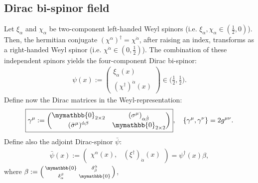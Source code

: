 \subsection{Dirac bi-spinor field} \label{sec:DiracbiSpinor}
Let $ \xi_{\alpha} $ and $ \chi_{\alpha} $ be two-component left-handed Weyl spinors (i.e. $ \xi_{\alpha}, \chi_{\alpha} \in (\frac{1}{2}, 0) $). Then, the hermitian conjugate $ (\chi^{\alpha})^{\dagger} = \chi^{\dot{\alpha}} $, after raising an index, transforms as a right-handed Weyl spinor (i.e. $ \chi^{\dot{\alpha}} \in (0, \frac{1}{2}) $). The combination of these independent spinors yields the four-component Dirac bi-spinor:
\begin{equation}
	\begin{aligned}
		\boxed{
			\psi(x) := \begin{pmatrix}
				\xi_{\alpha} (x)\\
				(\chi^{\dagger})^{\dot{\alpha}} (x)
			\end{pmatrix}
		}
		\in \big(\frac{1}{2}, \frac{1}{2}\big).
	\end{aligned}
\end{equation}
Define now the Dirac matrices in the Weyl-representation:
\begin{equation}
	\begin{aligned}
		\boxed{
			\gamma^{\mu} := \begin{pmatrix}
				\mymathbb{0}_{2 \times 2} & \tensor{(\sigma^{\mu})}{_{\alpha \dot{\beta}}} \\
				\tensor{(\bar{\sigma}^{\mu})}{^{\dot{\alpha} \beta}} & \mymathbb{0}_{2 \times 2}
			\end{pmatrix}
		}
		, \quad
		\{\gamma^{\mu}, \gamma^{\nu} \} = 2 \metric^{\mu \nu}.
	\end{aligned}
\end{equation}
Define also the adjoint Dirac-spinor $ \bar{\psi} $:
\begin{equation}
	\begin{aligned}
		\boxed{
			\bar{\psi}(x) := \begin{pmatrix}
				\chi^{\alpha} (x), & (\xi^{\dagger})_{\dot{\alpha}} (x)
			\end{pmatrix}
			= \psi^{\dagger} (x) \beta ,
		}
	\end{aligned}
\end{equation}
where $ \beta := \Big(\begin{smallmatrix}
	\mymathbb{0} & \tensor*{\delta}{^{\dot{\alpha}} _{\dot{\beta}}} \\
	\tensor*{\delta}{_{\alpha} ^{\beta}}& \mymathbb{0}
\end{smallmatrix}\Big) $,

